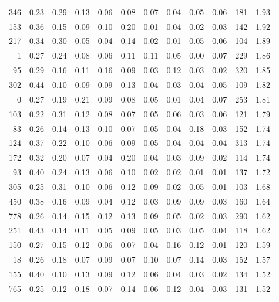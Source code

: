 \begin{tabular}{rrrrrrrrrrll}
          346 & 0.23 & 0.29 & 0.13 & 0.06 & 0.08 & 0.07 & 0.04 & 0.05 & 0.06 & 181 &  1.93 \\
          153 & 0.36 & 0.15 & 0.09 & 0.10 & 0.20 & 0.01 & 0.04 & 0.02 & 0.03 & 142 &  1.92 \\
          217 & 0.34 & 0.30 & 0.05 & 0.04 & 0.14 & 0.02 & 0.01 & 0.05 & 0.06 & 104 &  1.89 \\
            1 & 0.27 & 0.24 & 0.08 & 0.06 & 0.11 & 0.11 & 0.05 & 0.00 & 0.07 & 229 &  1.86 \\
           95 & 0.29 & 0.16 & 0.11 & 0.16 & 0.09 & 0.03 & 0.12 & 0.03 & 0.02 & 320 &  1.85 \\
          302 & 0.44 & 0.10 & 0.09 & 0.09 & 0.13 & 0.04 & 0.03 & 0.04 & 0.05 & 109 &  1.82 \\
            0 & 0.27 & 0.19 & 0.21 & 0.09 & 0.08 & 0.05 & 0.01 & 0.04 & 0.07 & 253 &  1.81 \\
          103 & 0.22 & 0.31 & 0.12 & 0.08 & 0.07 & 0.05 & 0.06 & 0.03 & 0.06 & 121 &  1.79 \\
           83 & 0.26 & 0.14 & 0.13 & 0.10 & 0.07 & 0.05 & 0.04 & 0.18 & 0.03 & 152 &  1.74 \\
          124 & 0.37 & 0.22 & 0.10 & 0.06 & 0.09 & 0.05 & 0.04 & 0.04 & 0.04 & 313 &  1.74 \\
          172 & 0.32 & 0.20 & 0.07 & 0.04 & 0.20 & 0.04 & 0.03 & 0.09 & 0.02 & 114 &  1.74 \\
           93 & 0.40 & 0.24 & 0.13 & 0.06 & 0.10 & 0.02 & 0.02 & 0.01 & 0.01 & 137 &  1.72 \\
          305 & 0.25 & 0.31 & 0.10 & 0.06 & 0.12 & 0.09 & 0.02 & 0.05 & 0.01 & 103 &  1.68 \\
          450 & 0.38 & 0.16 & 0.09 & 0.04 & 0.12 & 0.03 & 0.09 & 0.09 & 0.03 & 160 &  1.64 \\
          778 & 0.26 & 0.14 & 0.15 & 0.12 & 0.13 & 0.09 & 0.05 & 0.02 & 0.03 & 290 &  1.62 \\
          251 & 0.43 & 0.14 & 0.11 & 0.05 & 0.09 & 0.05 & 0.03 & 0.05 & 0.04 & 118 &  1.62 \\
          150 & 0.27 & 0.15 & 0.12 & 0.06 & 0.07 & 0.04 & 0.16 & 0.12 & 0.01 & 120 &  1.59 \\
           18 & 0.26 & 0.18 & 0.07 & 0.09 & 0.07 & 0.10 & 0.07 & 0.14 & 0.03 & 152 &  1.57 \\
          155 & 0.40 & 0.10 & 0.13 & 0.09 & 0.12 & 0.06 & 0.04 & 0.03 & 0.02 & 134 &  1.52 \\
          765 & 0.25 & 0.12 & 0.18 & 0.07 & 0.14 & 0.06 & 0.12 & 0.04 & 0.03 & 131 &  1.52 \\

\end{tabular}
